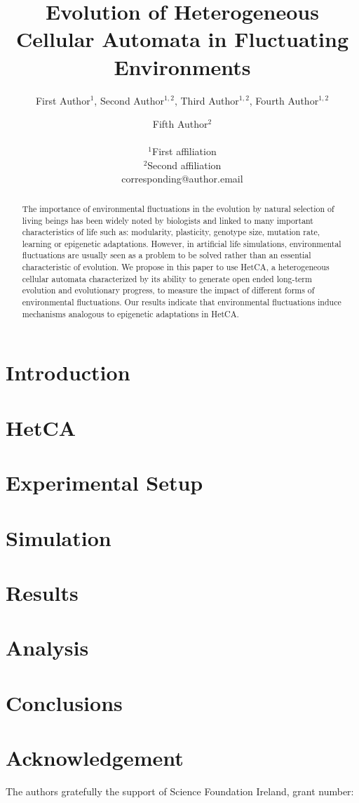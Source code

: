 \documentclass[letterpaper]{article}
\title{Evolution of Heterogeneous Cellular Automata in Fluctuating Environments}
\author{First Author$^{1}$, Second Author$^{1,2}$, Third Author$^{1,2}$, Fourth Author$^{1,2}$ \and Fifth Author$^2$ \\
\mbox{}\\
$^1$First affiliation  \\
$^2$Second affiliation \\
corresponding@author.email}
\begin{document}
\maketitle

\begin{abstract}
The importance of environmental fluctuations in the evolution by natural selection of living beings has been widely noted by biologists and linked to many important characteristics of life such as: modularity, plasticity, genotype size, mutation rate, learning or epigenetic adaptations. However, in artificial life simulations, environmental fluctuations are usually seen as a problem to be solved rather than an essential characteristic of evolution. We propose in this paper to use HetCA, a heterogeneous cellular automata characterized by its ability to generate open ended long-term evolution and evolutionary progress, to measure the impact of different forms of environmental fluctuations. Our results indicate that environmental fluctuations induce mechanisms analogous to epigenetic adaptations in HetCA.
\end{abstract}



\section{Introduction}\label{sec:intro}


%

\section{HetCA}\label{sec:hetca)}


\section{Experimental Setup}\label{sec:exsetup}


\section{Simulation}\label{sec:method}



\section{Results}\label{sec:method}




\section{Analysis}



\section{Conclusions}\label{sec:conc}


\section{Acknowledgement}
The authors gratefully the support of Science Foundation Ireland, grant number:


\end{document}
